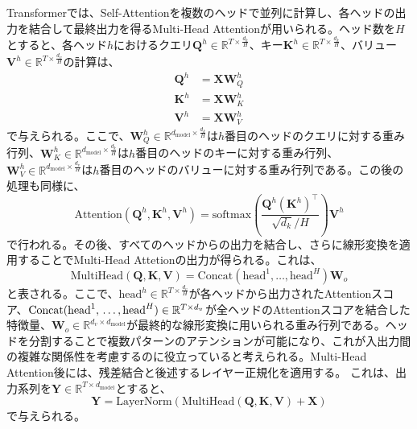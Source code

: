\documentclass[12pt]{jarticle}
\numberwithin{equation}{section}    %
\numberwithin{figure}{section}      %
\numberwithin{table}{section}      %
\begin{document}
Transformerでは、Self-Attentionを複数のヘッドで並列に計算し、各ヘッドの出力を結合して最終出力を得るMulti-Head Attentionが用いられる。ヘッド数を$H$とすると、各ヘッド$h$におけるクエリ$\bm{Q}^{h} \in \mathbb{R}^{T \times \frac{d_{k}}{H}}$、キー$\bm{K}^{h} \in \mathbb{R}^{T \times \frac{d_{k}}{H}}$、バリュー$\bm{V}^{h} \in \mathbb{R}^{T \times \frac{d_{v}}{H}}$の計算は、
\begin{align}
    \bm{Q}^{h} & = \bm{X}\bm{W}_{Q}^{h} \\
    \bm{K}^{h} & = \bm{X}\bm{W}_{K}^{h} \\
    \bm{V}^{h} & = \bm{X}\bm{W}_{V}^{h}
\end{align}
で与えられる。ここで、$\bm{W}_{Q}^{h} \in \mathbb{R}^{d_{\text{model}} \times \frac{d_{k}}{H}}$は$h$番目のヘッドのクエリに対する重み行列、$\bm{W}_{K}^{h} \in \mathbb{R}^{d_{\text{model}} \times \frac{d_{k}}{H}}$は$h$番目のヘッドのキーに対する重み行列、$\bm{W}_{V}^{h} \in \mathbb{R}^{d_{\text{model}} \times \frac{d_{v}}{H}}$は$h$番目のヘッドのバリューに対する重み行列である。この後の処理も同様に、
\begin{equation}
    \text{Attention}(\bm{Q}^{h}, \bm{K}^{h}, \bm{V}^{h}) = \text{softmax}\left(\frac{\bm{Q}^{h}(\bm{K}^{h})^\top}{\sqrt{d_{k}} / H}\right) \bm{V}^{h}
\end{equation}
で行われる。その後、すべてのヘッドからの出力を結合し、さらに線形変換を適用することでMulti-Head Attetionの出力が得られる。これは、
\begin{equation}
    \text{MultiHead}(\bm{Q}, \bm{K}, \bm{V}) = \text{Concat}(\text{head}^{1}, \ldots, \text{head}^{H})\bm{W}_{o}
\end{equation}
と表される。ここで、$\text{head}^{h} \in \mathbb{R}^{T \times \frac{d_{v}}{H}}$が各ヘッドから出力されたAttentionスコア、$\text{Concat}(\text{head}^{1}, \\ \ldots, \text{head}^{H}) \in \mathbb{R}^{T \times d_{v}}$が全ヘッドのAttentionスコアを結合した特徴量、$\bm{W}_{o} \in \mathbb{R}^{d_{v} \times d_{\text{model}}}$が最終的な線形変換に用いられる重み行列である。ヘッドを分割することで複数パターンのアテンションが可能になり、これが入出力間の複雑な関係性を考慮するのに役立っていると考えられる。Multi-Head Attention後には、残差結合と後述するレイヤー正規化を適用する。
これは、出力系列を$\bm{Y} \in \mathbb{R}^{T \times d_{\text{model}}}$とすると、
\begin{equation}
    \bm{Y} = \text{LayerNorm}\left(\text{MultiHead}(\bm{Q}, \bm{K}, \bm{V}) + \bm{X}\right)
\end{equation}
で与えられる。
\end{document}
